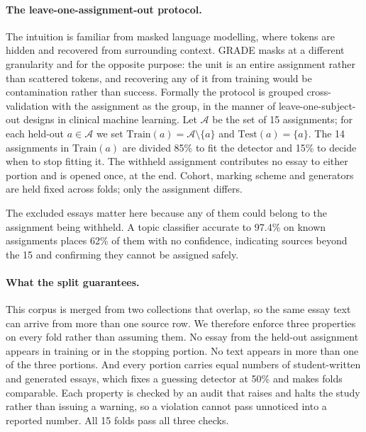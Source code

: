 \documentclass{article}
\begin{document}
\paragraph{The leave-one-assignment-out protocol.}
The intuition is familiar from masked language modelling, where tokens are
hidden and recovered from surrounding context. GRADE masks at a different
granularity and for the opposite purpose: the unit is an entire assignment
rather than scattered tokens, and recovering any of it from training would
be contamination rather than success. Formally the protocol is grouped
cross-validation with the assignment as the group, in the manner of
leave-one-subject-out designs in clinical machine learning. Let
$\mathcal{A}$ be the set of 15 assignments; for each held-out
$a \in \mathcal{A}$ we set $\mathrm{Train}(a) = \mathcal{A}\setminus\{a\}$
and $\mathrm{Test}(a) = \{a\}$. The 14 assignments in $\mathrm{Train}(a)$
are divided 85\% to fit the detector and 15\% to decide when to stop
fitting it. The withheld assignment contributes no essay to either portion
and is opened once, at the end. Cohort, marking scheme and generators are
held fixed across folds; only the assignment differs.

The excluded essays matter here because any of them could belong to the
assignment being withheld. A topic classifier accurate to 97.4\% on
known assignments places 62\% of them with no confidence, indicating
sources beyond the 15 and confirming they cannot be assigned safely.

\paragraph{What the split guarantees.}
This corpus is merged from two collections that overlap, so the same essay
text can arrive from more than one source row. We therefore enforce three
properties on every fold rather than assuming them. No essay from the
held-out assignment appears in training or in the stopping portion. No text
appears in more than one of the three portions. And every portion carries
equal numbers of student-written and generated essays, which fixes a
guessing detector at 50\% and makes folds comparable. Each property is
checked by an audit that raises and halts the study rather than issuing a
warning, so a violation cannot pass unnoticed into a reported number. All
15 folds pass all three checks.
\end{document}
